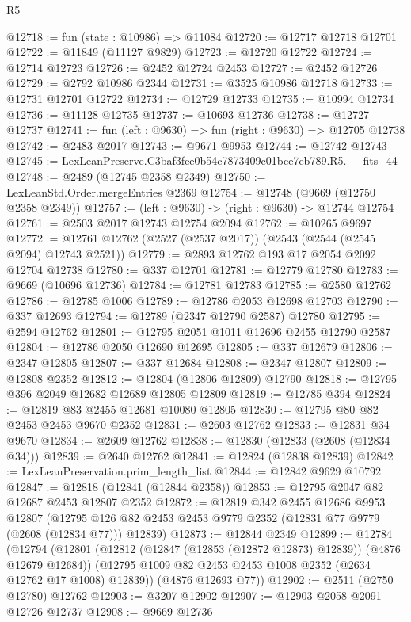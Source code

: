 \begin{lexlean}{R5}
\begin{coremodule}
@12718 := fun (state : @10986) => @11084
@12720 := @12717 @12718 @12701
@12722 := @11849 (@11127 @9829)
@12723 := @12720 @12722
@12724 := @12714 @12723
@12726 := @2452 @12724 @2453
@12727 := @2452 @12726
@12729 := @2792 @10986 @2344
@12731 := @3525 @10986 @12718
@12733 := @12731 @12701 @12722
@12734 := @12729 @12733
@12735 := @10994 @12734
@12736 := @11128 @12735
@12737 := @10693 @12736
@12738 := @12727 @12737
@12741 := fun (left : @9630) => fun (right : @9630) => @12705 @12738
@12742 := @2483 @2017
@12743 := @9671 @9953
@12744 := @12742 @12743
@12745 := LexLeanPreserve.C3baf3fee0b54c7873409c01bce7eb789.R5.__fits_44
@12748 := @2489 (@12745 @2358 @2349)
@12750 := LexLeanStd.Order.mergeEntries @2369
@12754 := @12748 (@9669 (@12750 @2358 @2349))
@12757 := (left : @9630) -> (right : @9630) -> @12744 @12754
@12761 := @2503 @2017 @12743 @12754 @2094
@12762 := @10265 @9697
@12772 := @12761 @12762 (@2527 (@2537 @2017)) (@2543 (@2544 (@2545 @2094) @12743 @2521))
@12779 := @2893 @12762 @193 @17 @2054 @2092 @12704 @12738
@12780 := @337 @12701
@12781 := @12779 @12780
@12783 := @9669 (@10696 @12736)
@12784 := @12781 @12783
@12785 := @2580 @12762
@12786 := @12785 @1006
@12789 := @12786 @2053 @12698 @12703
@12790 := @337 @12693
@12794 := @12789 (@2347 @12790 @2587) @12780
@12795 := @2594 @12762
@12801 := @12795 @2051 @1011 @12696 @2455 @12790 @2587
@12804 := @12786 @2050 @12690 @12695
@12805 := @337 @12679
@12806 := @2347 @12805
@12807 := @337 @12684
@12808 := @2347 @12807
@12809 := @12808 @2352
@12812 := @12804 (@12806 @12809) @12790
@12818 := @12795 @396 @2049 @12682 @12689 @12805 @12809
@12819 := @12785 @394
@12824 := @12819 @83 @2455 @12681 @10080 @12805
@12830 := @12795 @80 @82 @2453 @2453 @9670 @2352
@12831 := @2603 @12762
@12833 := @12831 @34 @9670
@12834 := @2609 @12762
@12838 := @12830 (@12833 (@2608 (@12834 @34)))
@12839 := @2640 @12762
@12841 := @12824 (@12838 @12839)
@12842 := LexLeanPreservation.prim_length_list
@12844 := @12842 @9629 @10792
@12847 := @12818 (@12841 (@12844 @2358))
@12853 := @12795 @2047 @82 @12687 @2453 @12807 @2352
@12872 := @12819
    @342
    @2455
    @12686
    @9953
    @12807
    (@12795 @126 @82 @2453 @2453 @9779 @2352 (@12831 @77 @9779 (@2608 (@12834 @77))) @12839)
@12873 := @12844 @2349
@12899 := @12784
    (@12794
      (@12801
        (@12812 (@12847 (@12853 (@12872 @12873) @12839)) (@4876 @12679 @12684))
        (@12795 @1009 @82 @2453 @2453 @1008 @2352 (@2634 @12762 @17 @1008) @12839))
      (@4876 @12693 @77))
@12902 := @2511 (@2750 @12780) @12762
@12903 := @3207 @12902
@12907 := @12903 @2058 @2091 @12726 @12737
@12908 := @9669 @12736

\end{coremodule}
\end{lexlean}
